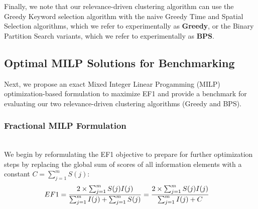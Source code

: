 

Finally, we note that our relevance-driven clustering algorithm can use the Greedy Keyword selection algorithm with the naive Greedy Time and Spatial Selection algorithms, which we refer to experimentally as {\bf Greedy}, or the Binary Partition Search variants, which we refer to experimentally as {\bf BPS}.  



\subsection{Optimal MILP Solutions for Benchmarking}

Next, we propose an exact Mixed Integer Linear Progamming (MILP) optimization-based formulation to maximize EF1 and provide a benchmark for evaluating our two relevance-driven clustering algorithms (Greedy and BPS).  %

\subsubsection{Fractional MILP Formulation} \hfill \\
We begin by reformulating the EF1 objective to prepare for further optimization steps by replacing the global sum of scores of all information elements with a constant $C = \sum_{j=1}^m S(j)$:
\begin{equation}
\begin{aligned}
    \emph{$EF1$} &= \dfrac{2\times \sum_{j=1}^m S(j)I(j)}{\sum_{j=1}^m I(j) + \sum_{j=1}^m S(j)} = \dfrac{2 \times \sum_{j=1}^m S(j)I(j)}{\sum_{j=1}^m I(j) + C}
\end{aligned}
\end{equation}

